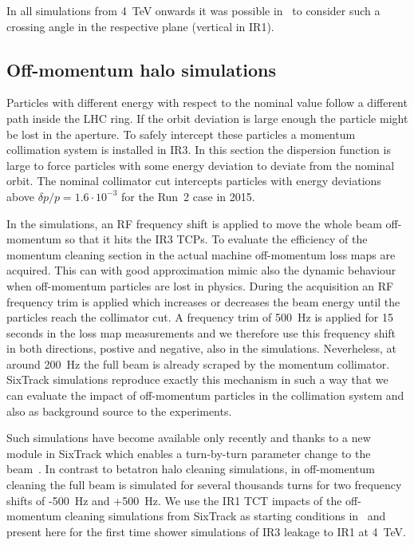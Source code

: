 In all simulations from 4~TeV onwards it was possible in \fluka~to consider such a crossing angle in the respective plane (vertical in IR1).

\subsection{Off-momentum halo simulations}
Particles with different energy with respect to the nominal value follow a different path inside the LHC ring. If the orbit deviation is large enough the particle might be lost in the aperture. To safely intercept these particles a momentum collimation system is installed in IR3. In this section the dispersion function is large to force particles with some energy deviation to deviate from the nominal orbit. The nominal collimator cut intercepts particles with energy deviations above $\delta p/p = 1.6\cdot 10^{-3}$ for the Run~2 case in 2015.


In the simulations, an RF frequency shift is applied to move the whole beam off-momentum so that it hits the IR3 TCPs. To evaluate the efficiency of the momentum cleaning section in the actual machine off-momentum loss maps are acquired. This can with good approximation mimic also the dynamic behaviour when off-momentum particles are lost in physics. During the acquisition an RF frequency trim is applied which increases or decreases the beam energy until the particles reach the collimator cut. A frequency trim of 500~Hz is applied for 15 seconds in the loss map measurements and we therefore use this frequency shift in both directions, postive and negative, also in the simulations. Neverheless, at around 200~Hz the full beam is already scraped by the momentum collimator. SixTrack simulations reproduce exactly this mechanism in such a way that we can evaluate the impact of off-momentum particles in the collimation system and also as background source to the experiments.

Such simulations have become available only recently and thanks to a new module in SixTrack which enables a turn-by-turn parameter change to the beam~\cite{KyrreIpac2015}. In contrast to betatron halo cleaning simulations, in off-momentum cleaning the full beam is simulated for several thousands turns for two frequency shifts of -500~Hz and +500~Hz. %
We use the IR1 TCT impacts of the off-momentum cleaning simulations from SixTrack as starting conditions in \fluka~and present here for the first time shower simulations of IR3 leakage to IR1 at 4~TeV. 


